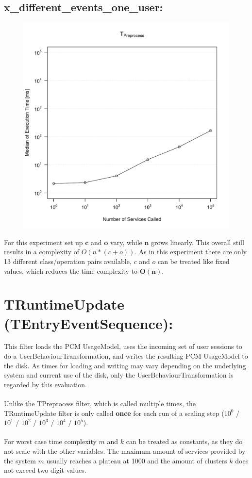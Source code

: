 \documentclass[10pt,a4paper]{article}
\begin{document}
	\subsection{x\_different\_events\_one\_user:}
	\begin{figure}[H]
		\centering
		\includegraphics[scale=0.7]{graphics/TPreprocess_median_different_events.pdf}
	\end{figure}
	For this experiment set up $\mathbf{c}$ and $\mathbf{o}$ vary, while $\mathbf{n}$ grows linearly. This overall still results in a complexity of $O(n * (c + o))$. As in this experiment there are only 13 different class/operation pairs available, $c$ and $o$ can be treated like fixed values, which reduces the time complexity to $\mathbf{O(n)}$.
	\newpage
	\section{TRuntimeUpdate (TEntryEventSequence):}
	This filter loads the PCM UsageModel, uses the incoming set of user sessions to do a UserBehaviourTransformation, and writes the resulting PCM UsageModel to the disk. As times for loading and writing may vary depending on the underlying system and current use of the disk, only the UserBehaviourTransformation is regarded by this evaluation.\\
	\\
	Unlike the TPreprocess filter, which is called multiple times, the TRuntimeUpdate filter is only called \textbf{once} for each run of a scaling step ($10^0$ / $10^1$ / $10^2$ / $10^3$ / $10^4$ / $10^5$).\\
	\\
	For worst case time complexity $m$ and $k$ can be treated as constants, as they do not scale with the other variables. The maximum amount of services provided by the system $m$ usually reaches a plateau at 1000 and the amount of clusters $k$ does not exceed two digit values.
\end{document}
